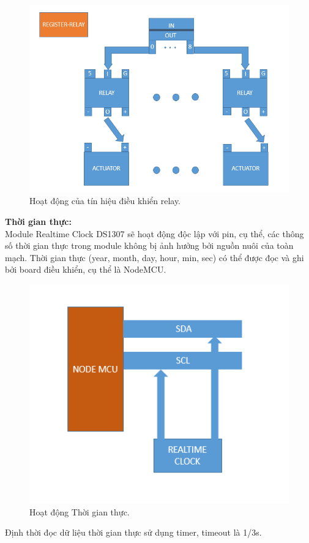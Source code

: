 \documentclass[a4paper,12pt,oneside]{article}
\begin{document}
\begin{center}
\begin{figure}[h!]
\begin{center}
\includegraphics[scale=0.7]{hinh/register_relay.PNG}
\end{center}
\caption{Hoạt động của tín hiệu điều khiển relay.}
\end{figure}
\end{center}

\noindent \textbf{Thời gian thực:}\\
\noindent Module Realtime Clock DS1307 sẽ hoạt động độc lập với pin, cụ thể, các thông số thời gian thực trong module không bị ảnh hưởng bởi nguồn nuôi của toàn mạch. Thời gian thực (year, month, day, hour, min, sec) có thể được đọc và ghi bởi board điều khiển, cụ thể là NodeMCU.
\begin{center}
\begin{figure}[h!]
\begin{center}
\includegraphics[scale=0.8]{hinh/Node_Realtime.PNG}
\end{center}
\caption{Hoạt động Thời gian thực.}
\end{figure}
\end{center}
\noindent Định thời đọc dữ liệu thời gian thực sử dụng timer, timeout là 1/3s.\\
\end{document}
